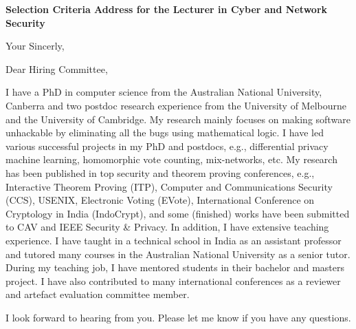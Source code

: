 \documentclass[11pt,a4paper,roman]{moderncv}
\begin{document}
\date{}
\opening{\textbf{Selection Criteria Address for the Lecturer in Cyber and Network Security}}
\closing{Your Sincerly, \vspace{-1em}}



\makelettertitle

Dear Hiring Committee, 


I have a PhD in computer science from the Australian National University, 
Canberra and two postdoc research experience from the University of 
Melbourne and the University of Cambridge.  
My research 
mainly focuses on making software unhackable by eliminating all 
the bugs using mathematical logic. I have led various successful projects
in my PhD and postdocs, e.g., differential privacy machine learning, 
homomorphic vote counting, mix-networks, etc.  My research has been 
published in top security and theorem proving conferences, e.g., 
Interactive Theorem Proving (ITP), 
Computer and Communications Security (CCS), USENIX, Electronic Voting (EVote), 
International Conference on Cryptology in India (IndoCrypt),
and some (finished) works have been submitted to CAV and IEEE Security \& Privacy. 
In addition, I have extensive teaching experience. I have taught in 
a technical school in India as an assistant professor and tutored 
many courses in the Australian National University as a senior tutor.
During my teaching job, I have mentored students in their bachelor and 
masters project. I have also contributed to many international conferences 
as a reviewer and artefact evaluation committee member.




I look forward to hearing from you. Please let me know if you have any questions. \\
 


\makeletterclosing
\end{document}
